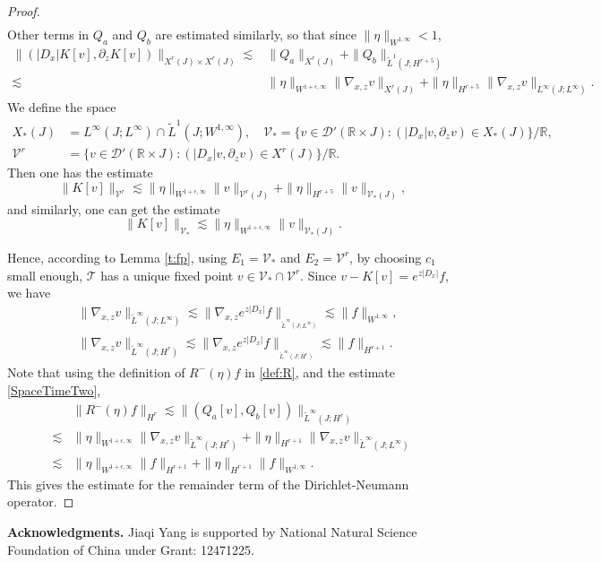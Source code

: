 \documentclass[12pt]{amsart}
\theoremstyle{definition}
\numberwithin{equation}{section}
\newcommand{\p}{\partial}
\newcommand{\wt}{\widetilde}
\newcommand{\R}{\mathbb{R}}
\begin{document}
\begin{proof}
\begin{align*}
\end{align*}
Other terms in $Q_a$ and $Q_b$ are estimated similarly, so that since $\|\eta\|_{W^{1,\infty}}< 1$,  
\begin{align*}
 \|( |D_x| K[v],\p_z K[v])\|_{X^r(J) \times X^r(J)} \lesssim&\|Q_a\|_{X^r(J)} +  \| Q_b\|_{\wt L^1(J;  H^{r+5})} \\
 \lesssim& \|\eta\|_{W^{1+\epsilon,\infty}} \|\nabla_{x,z} v\|_{X^r(J)} + \| \eta\|_{H^{r+5}}   \|\nabla_{x,z}  v\|_{L^\infty(J; L^\infty)}.
\end{align*}
We define the space
\begin{align*}
 X_*(J)& = L^\infty(J; L^\infty) \cap \wt L^1(J;  W^{1,\infty}), \quad  \mathcal{V}_*=\{v\in \mathcal{D}'(\R\times J): (|D_x|v, \p_zv)\in X_*(J)\}/\R, \\
  \mathcal{V}^r&=\{v\in \mathcal{D}'(\R\times J): (|D_x|v, \p_zv)\in   X^r(J)\}/\R.
\end{align*}
Then one has the estimate 
\begin{equation*}
 \|K[v] \|_{ \mathcal{V}^r} \lesssim \|\eta\|_{W^{1+\epsilon,\infty}} \| v\|_{\mathcal{V}^r(J)} + \| \eta\|_{H^{r+5}}   \|  v\|_{\mathcal{V}_*(J)},
\end{equation*}
and similarly, one can get the estimate
\begin{equation*}
 \|K[v] \|_{ \mathcal{V}_*} \lesssim \|\eta\|_{W^{1+\epsilon,\infty}} \| v\|_{\mathcal{V}_*(J)}.
\end{equation*}

Hence, according to Lemma \ref{t:fp}, using $E_1 = \mathcal{V}_*$ and $E_2 = \mathcal{V}^r$, by choosing $c_1$ small enough, $\mathcal{T}$ has a unique fixed point $v \in \mathcal{V}_* \cap  \mathcal{V}^r$.
Since $v- K[v] = e^{z|D_x|}f$, we have
\begin{align*}
   &\|\nabla_{x,z} v\|_{\wt L^\infty (J; L^\infty)}\lesssim \|\nabla_{x,z}e^{z|D_x|}f\|_{_{\wt L^\infty (J; L^\infty)}} \lesssim \|f\|_{W^{1,\infty}}, \\
   &\|\nabla_{x,z} v\|_{\wt L^\infty (J; H^r)}\lesssim \|\nabla_{x,z}e^{z|D_x|}f\|_{_{\wt L^\infty (J; H^r)}} \lesssim \|f\|_{H^{r+1}}.
\end{align*}
Note that using the definition of $R^-(\eta) f$ in \eqref{def:R}, and the estimate \eqref{SpaceTimeTwo},
\begin{align*}
 &\|R^-(\eta)f\|_{H^r} \lesssim \|(Q_a[v], Q_b[v]) \|_{\wt L^\infty (J; H^{r})}\\
 \lesssim &\|\eta\|_{W^{1+\epsilon,\infty}} \|\nabla_{x,z} v\|_{\wt L^\infty (J; H^{r})} + \|\eta\|_{H^{r+1}}  \|\nabla_{x,z} v\|_{\wt L^\infty (J; L^\infty)}\\
 \lesssim &\|\eta\|_{W^{1+\epsilon,\infty}} \|f\|_{ H^{r+1}} + \|\eta\|_{H^{r+1}}  \|f\|_{W^{1,\infty}}.
\end{align*}
This gives the estimate for the remainder term of the Dirichlet-Neumann operator.
\end{proof}

\textbf{Acknowledgments.}
Jiaqi Yang is supported by National Natural Science Foundation of China under Grant: 12471225.



	
\end{document}
